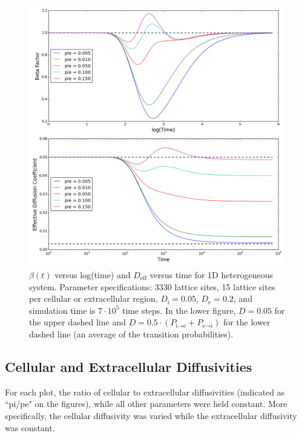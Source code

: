 	\begin{figure}[h!]
		\centering
		\includegraphics[width=1.0\linewidth]{../images/1D/pie_beta_deff_1D}
		\caption[1D: $ \beta (t) $ and $ D_\textrm{eff} $ for varying boundary transition probabilities]{$ \beta (t) $ versus log(time) and $ D_\textrm{eff} $ versus time for 1D heterogeneous system. Parameter specifications: 3330 lattice sites, 15 lattice sites per cellular or extracellular region, $ D_\textrm{i} = 0.05 $, $ D_\textrm{e} = 0.2 $, and simulation time is $ 7\cdot 10^5 $ time steps. In the lower figure, $ D = 0.05 $ for the upper dashed line and $ D = 0.5 \cdot (P_{\textrm{i} \rightarrow \textrm{e}} + P_{\textrm{e} \rightarrow \textrm{i}}) $ for the lower dashed line (an average of the transition probabilities).}
		\label{fig:pie_beta_deff_1D}
	\end{figure}

\clearpage
\subsection{Cellular and Extracellular Diffusivities}
\label{sec:1D-cellular-extracellular-diffusivities}
	For each plot, the ratio of cellular to extracellular diffusivities (indicated as ``pi/pe" on the figures), while all other parameters were held constant. More specifically, the cellular diffusivity was varied while the extracellular diffusivity was constant.
	
